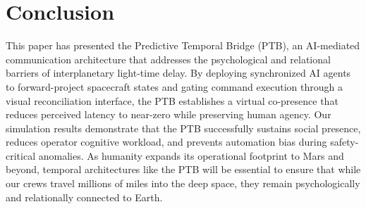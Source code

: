 \documentclass[12pt,a4paper]{article}
\begin{document}
\section{Conclusion}

This paper has presented the Predictive Temporal Bridge (PTB), an AI-mediated communication architecture that addresses the psychological and relational barriers of interplanetary light-time delay. By deploying synchronized AI agents to forward-project spacecraft states and gating command execution through a visual reconciliation interface, the PTB establishes a virtual co-presence that reduces perceived latency to near-zero while preserving human agency. Our simulation results demonstrate that the PTB successfully sustains social presence, reduces operator cognitive workload, and prevents automation bias during safety-critical anomalies. As humanity expands its operational footprint to Mars and beyond, temporal architectures like the PTB will be essential to ensure that while our crews travel millions of miles into the deep space, they remain psychologically and relationally connected to Earth.



\end{document}
